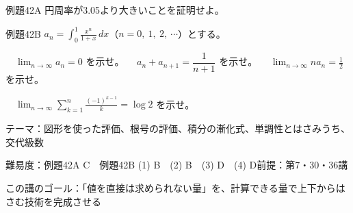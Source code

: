 \documentclass[paper=b5j, fontsize=8pt, fleqn, twoside]{jlreq}
\begin{document}
\begin{ascolorbox4A}[出典：東京大学 2003年度]{例題42A}
  円周率が3.05より大きいことを証明せよ。
\end{ascolorbox4A}

\begin{ascolorbox4A}[出典：オリジナル]{例題42B}
  $a_n=\displaystyle\int_0^1\frac{x^n}{1+x}\,dx$（$n=0,\ 1,\ 2,\ \cdots$）とする。\par
  　$\displaystyle\lim_{n\to\infty}a_n=0$ を示せ。\qquad
  　$a_n+a_{n+1}=\dfrac1{n+1}$ を示せ。\qquad
  　$\displaystyle\lim_{n\to\infty}na_n=\frac12$ を示せ。\par
  　$\displaystyle\lim_{n\to\infty}\sum_{k=1}^n\frac{(-1)^{k-1}}k=\log2$ を示せ。
\end{ascolorbox4A}

\begin{Data}
  テーマ：図形を使った評価、根号の評価、積分の漸化式、単調性とはさみうち、交代級数\par
  難易度：例題42A C　例題42B (1) B　(2) B　(3) D　(4) D\quad 前提：第7・30・36講\par
  この講のゴール：「値を直接は求められない量」を、計算できる量で上下からはさむ技術を完成させる
\end{Data}
\end{document}
